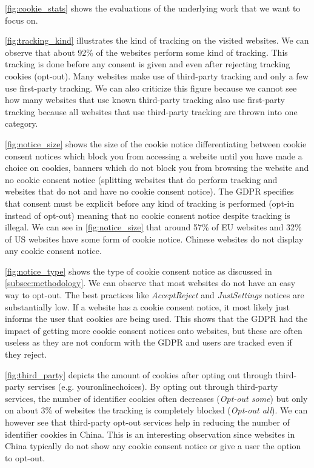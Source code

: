 \autoref{fig:cookie_stats} shows the evaluations of the underlying work that we want to focus on.

\autoref{fig:tracking_kind} illustrates the kind of tracking on the visited websites. We can observe that about 92\% of
the websites perform some kind of tracking. This tracking is done before any consent is given and even after rejecting
tracking cookies (opt-out). Many websites make use of third-party tracking and only a few use first-party tracking. We
can also criticize this figure because we cannot see how many websites that use known third-party tracking also use
first-party tracking because all websites that use third-party tracking are thrown into one category.

\autoref{fig:notice_size} shows the size of the cookie notice differentiating between cookie consent notices which block
you from accessing a website until you have made a choice on cookies, banners which do not block you from browsing the
website and no cookie consent notice (splitting websites that do perform tracking and websites that do not and have no
cookie consent notice). The GDPR specifies that consent must be explicit before any kind of tracking is performed
(opt-in instead of opt-out) meaning that no cookie consent notice despite tracking is illegal.
We can see in \autoref{fig:notice_size} that around 57\% of EU websites and 32\% of US
websites have some form of cookie notice. Chinese websites do not display any cookie consent notice.

\autoref{fig:notice_type} shows the type of cookie consent notice as discussed in \autoref{subsec:methodology}.
We can observe that most websites do not have an easy way to opt-out. The best practices like \emph{AcceptReject} and
\emph{JustSettings} notices are substantially low. If a website has a cookie consent notice, it
most likely just informs the user that cookies are being used. This shows that the GDPR had the impact of getting more
cookie consent notices onto websites, but these are often useless as they are not conform with the GDPR and users are
tracked even if they reject.

\autoref{fig:third_party} depicts the amount of cookies after opting out through third-party servises (e.g.
youronlinechoices). By opting out through third-party services, the number of identifier cookies often decreases
(\emph{Opt-out some}) but only on about 3\% of websites the tracking is completely blocked (\emph{Opt-out all}). We can
however see that third-party opt-out services help in reducing the number of identifier cookies in China. This is an
interesting observation since websites in China typically do not show any cookie consent notice or give a user the
option to opt-out.

